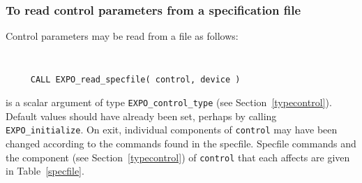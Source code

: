 \documentclass{galahad}
\newcommand{\packagename}{EXPO}
\begin{document}
\subsubsection{To read control parameters from a specification file}
\label{readspec}

Control parameters may be read from a file as follows:
\hskip0.5in
\def\baselinestretch{0.8} {\tt
\begin{verbatim}
     CALL EXPO_read_specfile( control, device )
\end{verbatim}
}
\def\baselinestretch{1.0}

\begin{description}
 is a scalar \intentinout argument of type
{\tt \packagename\_control\_type}
(see Section~\ref{typecontrol}).
Default values should have already been set, perhaps by calling
{\tt \packagename\_initialize}.
On exit, individual components of {\tt control} may have been changed
according to the commands found in the specfile. Specfile commands and
the component (see Section~\ref{typecontrol}) of {\tt control}
that each affects are given in Table~\vref{specfile}.


\end{description}
\end{document}
